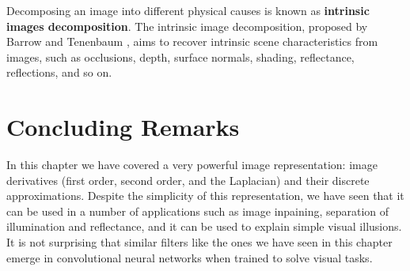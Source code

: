 Decomposing an image into different physical causes is known as {\bf intrinsic images decomposition}.
The intrinsic image decomposition, proposed by Barrow and Tenenbaum \cite{Barrow1978}, aims to recover intrinsic scene characteristics from images, such as occlusions, depth, surface normals, shading, reflectance, reflections, and so on.



\section{Concluding Remarks}

In this chapter we have covered a very powerful image representation: image derivatives (first order, second order, and the Laplacian) and their discrete approximations. Despite the simplicity of this representation, we have seen that it can be used in a number of applications such as image inpaining, separation of illumination and reflectance, and it can be used to explain simple visual illusions. It is not surprising that similar filters like the ones we have seen in this chapter emerge in convolutional neural networks when trained to solve visual tasks.

